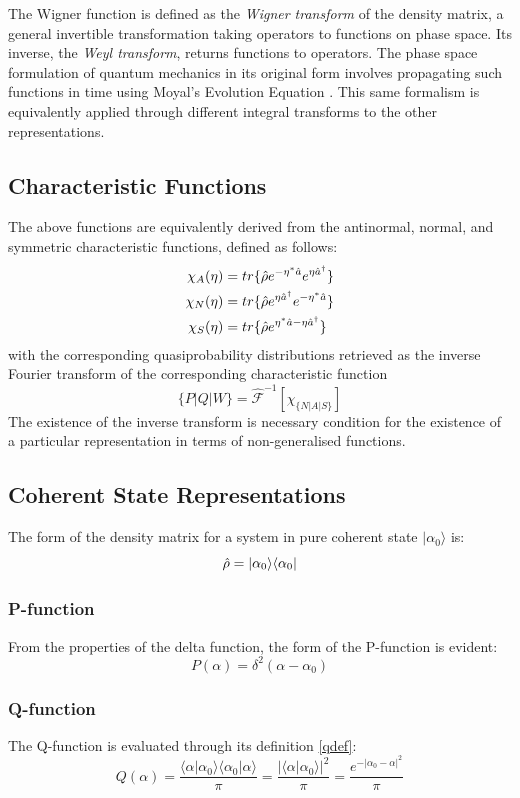 The Wigner function is defined as the \emph{Wigner transform} of the density matrix, a general invertible transformation taking operators to functions on phase space. Its inverse, the \emph{Weyl transform}, returns functions to operators. The phase space formulation of quantum mechanics in its original form involves propagating such functions in time using Moyal's Evolution Equation \autocite{Curtright2011}. This same formalism is equivalently applied  through different integral transforms to the other representations.
\subsection{Characteristic Functions}
The above functions are equivalently derived from the antinormal, normal, and symmetric characteristic functions, defined as follows:
\begin{align}
	\chi_{A} (\eta) &= tr\{\hat{\rho} e^{-\eta^* \hat{a}}e^{\eta \hat{a}^\dagger } \} \\
	\chi_{N} (\eta) &= tr\{\hat{\rho} e^{\eta \hat{a}^\dagger}e^{-\eta^* \hat{a} } \} \\
	\chi_{S} (\eta) &= tr\{\hat{\rho} e^{\eta^* \hat{a}-\eta \hat{a}^\dagger } \}
\end{align}
with the corresponding quasiprobability distributions retrieved as the inverse Fourier transform of the corresponding characteristic function
 \begin{equation}
 	\{P|Q|W\} = \hat{\mathscr{F}}^{-1} [\chi_{\{N|A|S\}}]
\end{equation}
The existence of the inverse transform is necessary condition for the existence of a particular representation in terms of non-generalised functions.
\subsection{Coherent State Representations}
The form of the density matrix for a system in pure coherent state $ | \alpha_0 \rangle $  is:
\begin{equation}
 	\hat{\rho} = | \alpha_0 \rangle \langle \alpha_0 |
 \end{equation}
 \subsubsection{P-function}
 From the properties of the delta function, the form of the P-function is evident:
\begin{equation}
	P(\alpha) = \delta^2(\alpha-\alpha_0)
\end{equation}
\subsubsection{Q-function}
The Q-function is evaluated through its definition \cref{qdef}:
\begin{equation}
	Q(\alpha) = \frac{\langle \alpha | \alpha_0 \rangle \langle \alpha_0 | \alpha \rangle}{\pi} = \frac{{|\langle \alpha | \alpha_0 \rangle |}^2}{\pi} =  \frac{e^{-{|\alpha_0 - \alpha |}^2}}{\pi}
\end{equation}
